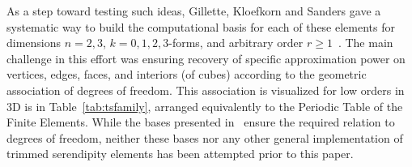 \documentclass[manuscript,screen]{acmart}
\newcommand\josh[1]{\textbf{\textcolor[rgb]{0,.5,1}{[Josh: #1]}}}
\begin{document}
  

  

	As a step toward testing such ideas, Gillette, Kloefkorn and Sanders gave a systematic way to build the computational basis for each of these elements for dimensions $n = 2, 3$, $k=0, 1, 2, 3$-forms, and arbitrary order $r \geq 1$~\cite{gillette2019computational}.
	The main challenge in this effort was ensuring recovery of specific approximation power on vertices, edges, faces, and interiors (of cubes) according to the geometric association of degrees of freedom.  
	This association is visualized for low orders in 3D is in Table~\ref{tab:tsfamily}, arranged equivalently to the Periodic Table of the Finite Elements.
	While the bases presented in~\cite{gillette2019computational} ensure the required relation to degrees of freedom, neither these bases nor any other general implementation of trimmed serendipity elements has been attempted prior to this paper.

	
	
  
\end{document}
